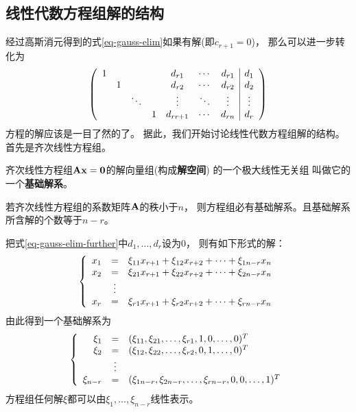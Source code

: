 \subsection{线性代数方程组解的结构}
经过高斯消元得到的式\ref{eq-gauss-elim}如果有解(即$c_{r+1}=0$)，
那么可以进一步转化为
\begin{equation} \label{eq-gauss-elim-further}
  \mmat{ccccccc|c}{
    1 &        &        &   & d_{r1}   & \cdots & d_{r1} & d_1    \\
      & 1      &        &   & d_{r2}   & \cdots & d_{r2} & d_2    \\
      &        & \ddots &   & \vdots   & \ddots & \vdots & \vdots \\
      &        &        & 1 & d_{rr+1} & \cdots & d_{rn} & d_r
  }
\end{equation}
方程的解应该是一目了然的了。
据此，我们开始讨论线性代数方程组解的结构。
首先是齐次线性方程组。

\begin{definition}[基础解系]
  齐次线性方程组$\mmA\mvx=\mvZero$的解向量组(构成\textbf{解空间})
  的一个极大线性无关组
  叫做它的一个\textbf{基础解系}。
\end{definition}

\begin{theorem}
  若齐次线性方程组的系数矩阵$\mmA$的秩小于$n$，
  则方程组必有基础解系。且基础解系所含解的个数等于$n-r$。
\end{theorem}

\begin{remark}
  把式\ref{eq-gauss-elim-further}中$d_1,\dots,d_r$设为0，
  则有如下形式的解：
  \begin{displaymath}
  \meqs{rcl}{
    x_1 &=& \xi_{11}x_{r+1}+\xi_{12}x_{r+2}+\cdots+\xi_{1n-r}x_{n} \\
    x_2 &=& \xi_{21}x_{r+1}+\xi_{22}x_{r+2}+\cdots+\xi_{2n-r}x_{n} \\
    & \vdots & \\
    x_r &=& \xi_{r1}x_{r+1}+\xi_{r2}x_{r+2}+\cdots+\xi_{rn-r}x_{n} \\
  }
  \end{displaymath}
  由此得到一个基础解系为
  \begin{displaymath}
  \meqs{rcl} {
    \xi_1 &=& (\xi_{11}, \xi_{21}, \dots, \xi_{r1}, 1, 0, \dots, 0)^T \\
    \xi_2 &=& (\xi_{12}, \xi_{22}, \dots, \xi_{r2}, 0, 1, \dots, 0)^T \\
    & \vdots & \\
    \xi_{n-r} &=& (\xi_{1n-r}, \xi_{2n-r}, \dots, \xi_{rn-r}, 0, 0, \dots, 1)^T
  }
  \end{displaymath}
  方程组任何解$\xi$都可以由$\xi_1,\dots,\xi_{n-r}$线性表示。
\end{remark}

